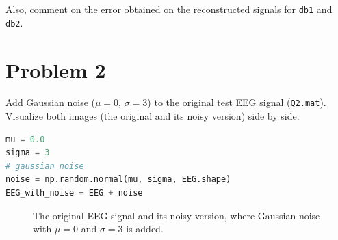 \begin{tcolorbox}[colback=red!5!white,colframe=red!75!black,title=Problem 1.d]
    Also, comment on the error obtained on the reconstructed signals for \verb|db1| and \verb|db2|.
\end{tcolorbox}



\section*{Problem 2} \label{sec:problem2}

\begin{tcolorbox}[colback=green!5!white,boxrule=0pt,frame empty]
    Add Gaussian noise ($\mu = 0$, $\sigma = 3$) to the original test
    EEG signal (\verb|Q2.mat|).
    Visualize both images (the original and its noisy version) side by side.
\end{tcolorbox}


\begin{lstlisting}[language=Python]
mu = 0.0
sigma = 3
# gaussian noise
noise = np.random.normal(mu, sigma, EEG.shape)
EEG_with_noise = EEG + noise
\end{lstlisting}




\begin{figure}[H]
    \centering
    \caption{The original EEG signal and its noisy version, where Gaussian noise with $\mu = 0$ and $\sigma = 3$ is added.}
    \label{fig:EEG_with_and_without_noise}
\end{figure}

